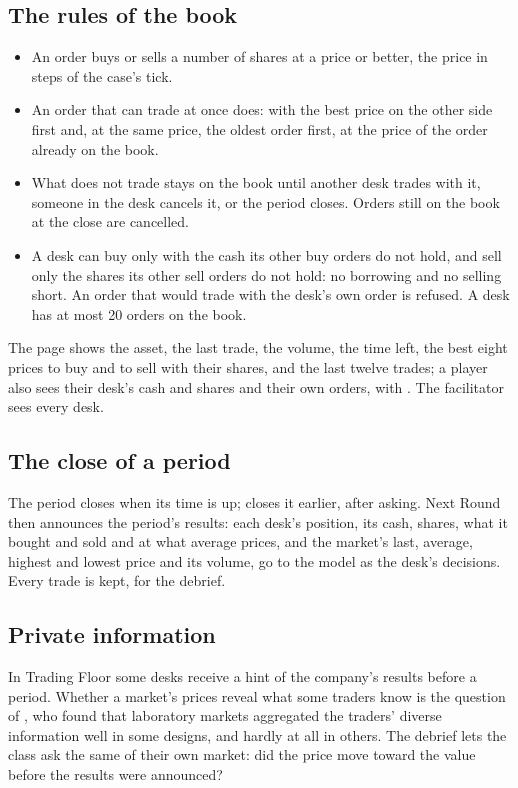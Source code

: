 \subsection{The rules of the book}
\begin{itemize}
  \item An order buys or sells a number of shares at a price or better, the price in steps of the case's tick.
  \item An order that can trade at once does: with the best price on the other side first and, at the same price,
    the oldest order first, at the price of the order already on the book.
  \item What does not trade stays on the book until another desk trades with it, someone in the desk cancels it,
    or the period closes. Orders still on the book at the close are cancelled.
  \item A desk can buy only with the cash its other buy orders do not hold, and sell only the shares its other sell
    orders do not hold: no borrowing and no selling short. An order that would trade with the desk's own order is
    refused. A desk has at most 20 orders on the book.
\end{itemize}
The page shows the asset, the last trade, the volume, the time left, the best eight prices to buy and to sell with
their shares, and the last twelve trades; a player also sees their desk's cash and shares and their own orders,
with . The facilitator sees every desk.

\subsection{The close of a period}
The period closes when its time is up;  closes it earlier, after asking. Next Round then announces
the period's results: each desk's position, its cash, shares, what it bought and sold and at what average prices,
and the market's last, average, highest and lowest price and its volume, go to the model as the desk's decisions.
Every trade is kept, for the debrief.

\subsection{Private information}
In Trading Floor some desks receive a hint of the company's results before a period. Whether a market's prices
reveal what some traders know is the question of , who found that laboratory
markets aggregated the traders' diverse information well in some designs, and hardly at all in others. The debrief
lets the class ask the same of their own market: did the price move toward the value before the results were
announced?

